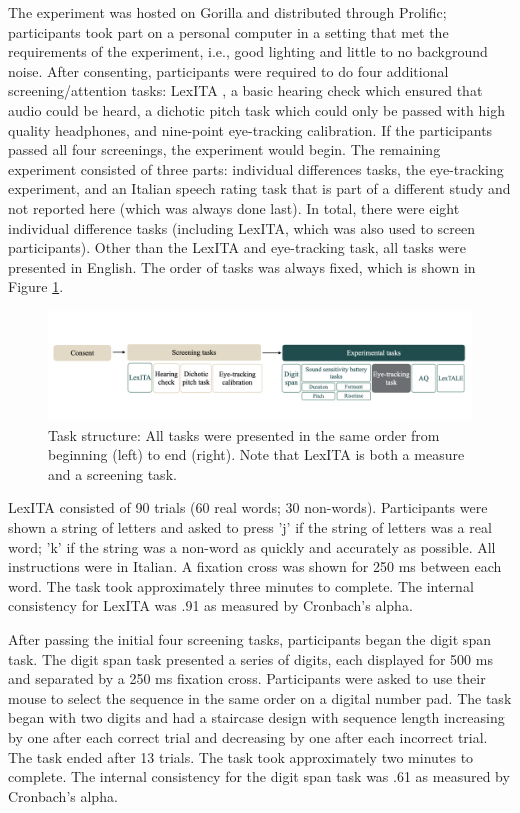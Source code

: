 The experiment was hosted on Gorilla and distributed through Prolific; participants took part on a personal computer in a setting that met the requirements of the experiment, i.e., good lighting and little to no background noise. After consenting, participants were required to do four additional screening/attention tasks: LexITA \cite{Amenta2021}, a basic hearing check which ensured that audio could be heard, a dichotic pitch task \citep{milne_2021} which could only be passed with high quality headphones, and nine-point eye-tracking calibration. If the participants passed all four screenings, the experiment would begin. The remaining experiment consisted of three parts: individual differences tasks, the eye-tracking experiment, and an Italian speech rating task that is part of a different study and not reported here (which was always done last). In total, there were eight individual difference tasks (including LexITA, which was also used to screen participants). Other than the LexITA and eye-tracking task, all tasks were presented in English. The order of tasks was always fixed, which is shown in Figure \ref{fig:task_structure}. 

\begin{figure}[H]
  \centering
  \includegraphics[width=1\linewidth]{visuals/task_structure.jpg}
  \caption{Task structure: All tasks were presented in the same order from beginning (left) to end (right). Note that LexITA is both a measure and a screening task.}
  \label{fig:task_structure}
\end{figure}

LexITA \citep{Amenta2021} consisted of 90 trials (60 real words; 30 non-words). Participants were shown a string of letters and asked to press 'j' if the string of letters was a real word; 'k' if the string was a non-word as quickly and accurately as possible. All instructions were in Italian. A fixation cross was shown for 250 ms between each word. The task took approximately three minutes to complete. The internal consistency for LexITA was .91 as measured by Cronbach's alpha.

After passing the initial four screening tasks, participants began the digit span task. The digit span task presented a series of digits, each displayed for 500 ms and separated by a 250 ms fixation cross. Participants were asked to use their mouse to select the sequence in the same order on a digital number pad. The task began with two digits and had a staircase design with sequence length increasing by one after each correct trial and decreasing by one after each incorrect trial. The task ended after 13 trials. The task took approximately two minutes to complete. The internal consistency for the digit span task was .61 as measured by Cronbach's alpha.

